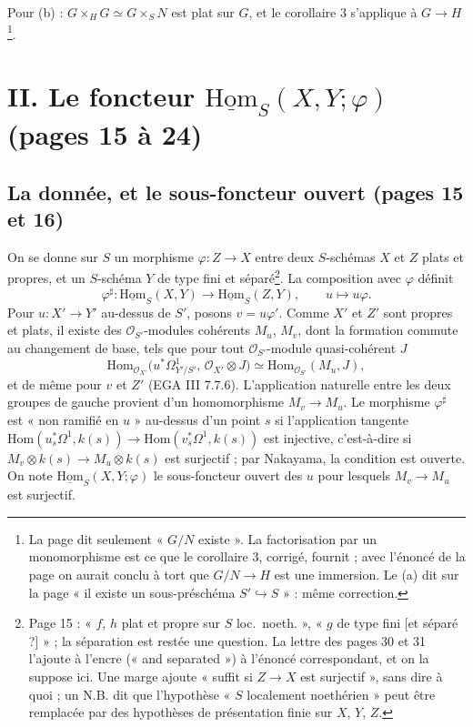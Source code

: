 \documentclass[11pt,a4paper]{article}
\begin{document}
Pour (b) : $G \times_H G \simeq G \times_S N$ est plat sur $G$, et le corollaire 3
s'applique à $G \to H$\footnote{La page dit seulement « $G/N$ existe ». La
factorisation par un monomorphisme est ce que le corollaire 3, corrigé,
fournit ; avec l'énoncé de la page on aurait conclu à tort que $G/N \to H$
est une immersion. Le (a) dit sur la page « il existe un sous-préschéma
$S' \hookrightarrow S$ » : même correction.}.

\section*{II. Le foncteur $\underline{\mathrm{Hom}}_S(X, Y; \varphi)$ (pages 15 à 24)}

\subsection*{La donnée, et le sous-foncteur ouvert (pages 15 et 16)}

On se donne sur $S$ un morphisme $\varphi : Z \to X$ entre deux $S$-schémas
$X$ et $Z$ plats et propres, et un $S$-schéma $Y$ de type fini et
séparé\footnote{Page 15 : « $f$, $h$ plat et propre sur $S$ loc.\ noeth. »,
« $g$ de type fini [et séparé ?] » ; la séparation est restée une question.
La lettre des pages 30 et 31 l'ajoute à l'encre (« and separated ») à
l'énoncé correspondant, et on la suppose ici. Une marge ajoute « suffit si
$Z \to X$ est surjectif », sans dire à quoi ; un N.B. dit que l'hypothèse
« $S$ localement noethérien » peut être remplacée par des hypothèses de
présentation finie sur $X$, $Y$, $Z$.}. La composition avec $\varphi$ définit
\[
  \varphi^{\sharp} : \underline{\mathrm{Hom}}_S(X,Y) \longrightarrow
  \underline{\mathrm{Hom}}_S(Z,Y), \qquad u \longmapsto u\varphi .
\]
Pour $u : X' \to Y'$ au-dessus de $S'$, posons $v = u\varphi'$. Comme $X'$ et
$Z'$ sont propres et plats, il existe des $\mathcal{O}_{S'}$-modules cohérents
$M_u$, $M_v$, dont la formation commute au changement de base, tels que pour
tout $\mathcal{O}_{S'}$-module quasi-cohérent $J$
\[
  \mathrm{Hom}_{\mathcal{O}_{X'}}\bigl(u^{*}\Omega^1_{Y'/S'},\, \mathcal{O}_{X'}
  \otimes J\bigr) \simeq \mathrm{Hom}_{\mathcal{O}_{S'}}(M_u, J),
\]
et de même pour $v$ et $Z'$ (EGA III 7.7.6). L'application naturelle entre les
deux groupes de gauche provient d'un homomorphisme $M_v \to M_u$. Le
morphisme $\varphi^{\sharp}$ est « non ramifié en $u$ » au-dessus d'un point
$s$ si l'application tangente
$\mathrm{Hom}(u_s^{*}\Omega^1, k(s)) \to \mathrm{Hom}(v_s^{*}\Omega^1, k(s))$
est injective, c'est-à-dire si $M_v \otimes k(s) \to M_u \otimes k(s)$ est
surjectif ; par Nakayama, la condition est ouverte. On note
$\underline{\mathrm{Hom}}_S(X,Y;\varphi)$ le sous-foncteur ouvert des $u$ pour
lesquels $M_v \to M_u$ est surjectif.
\end{document}
